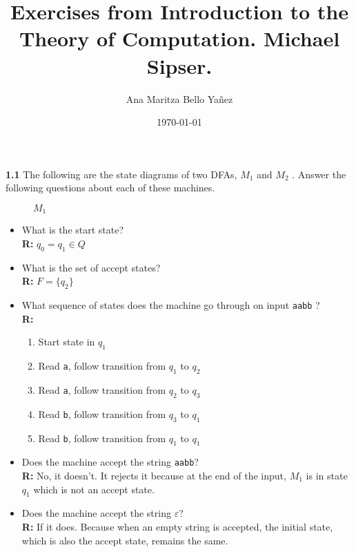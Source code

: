 \documentclass{article}
\title{Exercises from Introduction to the Theory of Computation. Michael Sipser.}
\author{Ana Maritza Bello Yañez}
\date{\today}
\begin{document}
\maketitle

\textbf{1.1} The following are the state diagrams of two DFAs, $M_1$ and $M_2$ . Answer
the following questions about each of these machines.


\begin{figure}[h!]
\centering
\caption{$M_1$}
\end{figure}
    

\begin{itemize}

\item What is the start state? \\
\textbf{R: } $q_0 = q_1 \in Q$

\item What is the set of accept states? \\
\textbf{R: } $F = \{q_2\}$

\item What sequence of states does the machine go through on input \texttt{aabb}
? \\
\textbf{R: }
\begin{enumerate}
    \item Start state in $q_1$
    \item Read \texttt{a}, follow transition from $q_1$ to $q_2$
    \item Read \texttt{a}, follow transition from $q_2$ to $q_3$
    \item Read \texttt{b}, follow transition from $q_3$ to $q_1$
    \item Read \texttt{b}, follow transition from $q_1$ to $q_1$
\end{enumerate}

\item Does the machine accept the string \texttt{aabb}? \\
\textbf{R: } No, it doesn't. It rejects it because at the end of the input,
$M_1$ is in state $q_1$ which is not an accept state.

\item Does the machine accept the string $\varepsilon$? \\
\textbf{R: } If it does. Because when an empty string is accepted, the initial
state, which is also the accept state, remains the same.
\end{itemize}
\end{document}
